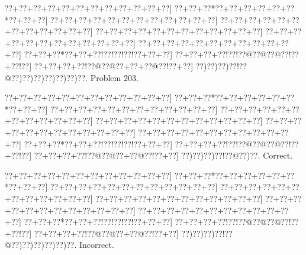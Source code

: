 \documentclass[a5paper]{article}
\begin{document}
\begin{center}
{\goo
\0??+\0??+\0??+\0??+\0??+\0??+\0??+\0??+\0??+\0??+\0??+\0??]
\0??+\0??+\0??*\0??+\0??+\0??+\0??+\0??+\0??*\0??+\0??+\0??]
\0??+\0??+\0??+\0??+\0??+\0??+\0??+\0??+\0??+\0??+\0??+\0??]
\0??+\0??+\0??+\0??+\0??+\0??+\0??+\0??+\0??+\0??+\0??+\0??]
\0??+\0??+\0??+\0??+\0??+\0??+\0??+\0??+\0??+\0??+\0??+\0??]
\0??+\0??+\0??+\0??+\0??+\0??+\0??+\0??+\0??+\0??+\0??+\0??]
\0??+\0??+\0??+\0??+\0??+\0??+\0??+\0??+\0??+\0??+\0??+\0??]
\0??+\0??+\0??*\0??+\0??+\0??!\0??!\0??!\0??!\0??+\0??+\0??]
\0??+\0??+\0??+\0??!\0??!\0??@\0??@\0??@\0??!\0??+\0??!\0??]
\0??+\0??+\0??+\0??!\0??@\0??@\0??+\0??+\0??@\0??!\0??+\0??]
\0??)\0??)\0??)\0??!\0??@\0??)\0??)\0??)\0??)\0??)\0??)\0??.
}
Problem 203.

\end{center}
\begin{center}
{\goo
\0??+\0??+\0??+\0??+\0??+\0??+\0??+\0??+\0??+\0??+\0??+\0??]
\0??+\0??+\0??*\0??+\0??+\0??+\0??+\0??+\0??*\0??+\0??+\0??]
\0??+\0??+\0??+\0??+\0??+\0??+\0??+\0??+\0??+\0??+\0??+\0??]
\0??+\0??+\0??+\0??+\0??+\0??+\0??+\0??+\0??+\0??+\0??+\0??]
\0??+\0??+\0??+\0??+\0??+\0??+\0??+\0??+\0??+\0??+\0??+\0??]
\0??+\0??+\0??+\0??+\0??+\0??+\0??+\0??+\0??+\0??+\0??+\0??]
\0??+\0??+\0??+\0??+\0??+\0??+\0??+\0??+\0??+\0??+\0??+\0??]
\0??+\0??+\0??*\0??+\0??+\0??!\0??!\0??!\0??!\0??+\0??+\0??]
\0??+\0??+\0??+\0??!\0??!\0??@\0??@\0??@\0??!\0??+\0??!\0??]
\0??+\0??+\0??+\0??!\0??@\0??@\0??+\0??@\0??!\0??+\0??]
\0??)\0??)\0??)\0??!\0??@\0??)\0??.
}
Correct. 

\end{center}
\begin{center}
{\goo
\0??+\0??+\0??+\0??+\0??+\0??+\0??+\0??+\0??+\0??+\0??+\0??]
\0??+\0??+\0??*\0??+\0??+\0??+\0??+\0??+\0??*\0??+\0??+\0??]
\0??+\0??+\0??+\0??+\0??+\0??+\0??+\0??+\0??+\0??+\0??+\0??]
\0??+\0??+\0??+\0??+\0??+\0??+\0??+\0??+\0??+\0??+\0??+\0??]
\0??+\0??+\0??+\0??+\0??+\0??+\0??+\0??+\0??+\0??+\0??+\0??]
\0??+\0??+\0??+\0??+\0??+\0??+\0??+\0??+\0??+\0??+\0??+\0??]
\0??+\0??+\0??+\0??+\0??+\0??+\0??+\0??+\0??+\0??+\0??+\0??]
\0??+\0??+\0??*\0??+\0??+\0??!\0??!\0??!\0??!\0??+\0??+\0??]
\0??+\0??+\0??+\0??!\0??!\0??@\0??@\0??@\0??!\0??+\0??!\0??]
\0??+\0??+\0??+\0??!\0??@\0??@\0??+\0??@\0??!\0??+\0??]
\0??)\0??)\0??)\0??!\0??@\0??)\0??)\0??)\0??)\0??)\0??.
}
Incorrect. 

\end{center}
\newpage
\end{document}
